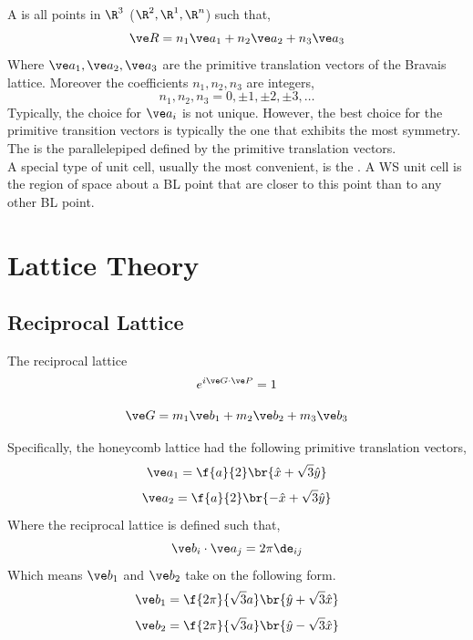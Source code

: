 \documentclass{article}
\begin{document}
\begin{center}
\end{center}

A  is all points in $\R^{3}$ ($\R^{2}, \R^{1}, \R^{n}$) such that,
\[ \ve R = n_1 \ve a_1 + n_2 \ve a_2 + n_3 \ve a_3 \]
Where $\ve a_1, \ve a_2, \ve a_3$ are the primitive translation vectors of the Bravais lattice. Moreover the coefficients $n_1, n_2, n_3$ are integers,
\[ n_1, n_2, n_3 = 0, \pm 1, \pm 2, \pm 3, \ldots \]
Typically, the choice for $\ve a_i$ is not unique. However, the best choice for the primitive transition vectors is typically the one that exhibits the most symmetry. \\

The  is the parallelepiped defined by the primitive translation vectors.\\

A special type of unit cell, usually the most convenient, is the . A WS unit cell is the region of space about a BL point that are closer to this point than to any other BL point.

\section{Lattice Theory}


\subsection{Reciprocal Lattice}
The reciprocal lattice
\[ e^{i \ve G \cdot \ve P} = 1 \]

\[ \ve G = m_1 \ve b_1 + m_2 \ve b_2 + m_3 \ve b_3\]

Specifically, the honeycomb lattice had the following primitive translation vectors,
\[ \ve a_1 = \f{a}{2} \br{\hat x + \sqrt{3} \hat y} \]
\[ \ve a_2 = \f{a}{2} \br{-\hat x + \sqrt{3} \hat y} \]
Where the reciprocal lattice is defined such that,
\[ \ve b_{i} \cdot \ve a_{j} = 2 \pi \de_{ij}  \]
Which means $\ve b_1$ and $\ve b_2$ take on the following form.
\[ \ve b_1 = \f{2\pi}{\sqrt{3} a} \br{\hat y + \sqrt{3} \hat x} \]
\[ \ve b_2 = \f{2\pi}{\sqrt{3} a} \br{\hat y - \sqrt{3} \hat x} \]
\end{document}
